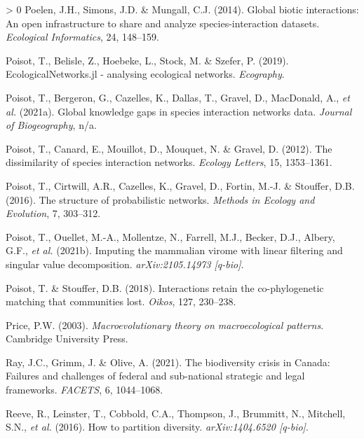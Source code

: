 \documentclass[11pt]{article}
\newlength{\cslhangindent}
\newenvironment{CSLReferences}[3] %
 {%
  \setlength{\parindent}{0pt}
  \ifodd #1 \everypar{\setlength{\hangindent}{\cslhangindent}}\ignorespaces\fi
  \ifnum #2 > 0
  \setlength{\parskip}{#2\baselineskip}
  \fi
 }%
 {}
\begin{document}
\begin{CSLReferences}{1}{0}
\leavevmode\hypertarget{ref-Poelen2014GloBio}{}%
Poelen, J.H., Simons, J.D. \& Mungall, C.J. (2014). Global biotic
interactions: An open infrastructure to share and analyze
species-interaction datasets. \emph{Ecological Informatics}, 24,
148--159.

\leavevmode\hypertarget{ref-Poisot2019EcoJl}{}%
Poisot, T., Belisle, Z., Hoebeke, L., Stock, M. \& Szefer, P. (2019).
EcologicalNetworks.jl - analysing ecological networks. \emph{Ecography}.

\leavevmode\hypertarget{ref-Poisot2021GloKno}{}%
Poisot, T., Bergeron, G., Cazelles, K., Dallas, T., Gravel, D.,
MacDonald, A., \emph{et al.} (2021a). Global knowledge gaps in species
interaction networks data. \emph{Journal of Biogeography}, n/a.

\leavevmode\hypertarget{ref-Poisot2012DisSpe}{}%
Poisot, T., Canard, E., Mouillot, D., Mouquet, N. \& Gravel, D. (2012).
The dissimilarity of species interaction networks. \emph{Ecology
Letters}, 15, 1353--1361.

\leavevmode\hypertarget{ref-Poisot2016StrPro}{}%
Poisot, T., Cirtwill, A.R., Cazelles, K., Gravel, D., Fortin, M.-J. \&
Stouffer, D.B. (2016). The structure of probabilistic networks.
\emph{Methods in Ecology and Evolution}, 7, 303--312.

\leavevmode\hypertarget{ref-Poisot2021ImpMam}{}%
Poisot, T., Ouellet, M.-A., Mollentze, N., Farrell, M.J., Becker, D.J.,
Albery, G.F., \emph{et al.} (2021b). Imputing the mammalian virome with
linear filtering and singular value decomposition.
\emph{arXiv:2105.14973 {[}q-bio{]}}.

\leavevmode\hypertarget{ref-Poisot2018IntRet}{}%
Poisot, T. \& Stouffer, D.B. (2018). Interactions retain the
co-phylogenetic matching that communities lost. \emph{Oikos}, 127,
230--238.

\leavevmode\hypertarget{ref-Price2003MacThe}{}%
Price, P.W. (2003). \emph{Macroevolutionary theory on macroecological
patterns}. Cambridge University Press.

\leavevmode\hypertarget{ref-Ray2021BioCri}{}%
Ray, J.C., Grimm, J. \& Olive, A. (2021). The biodiversity crisis in
Canada: Failures and challenges of federal and sub-national strategic
and legal frameworks. \emph{FACETS}, 6, 1044--1068.

\leavevmode\hypertarget{ref-Reeve2016HowPar}{}%
Reeve, R., Leinster, T., Cobbold, C.A., Thompson, J., Brummitt, N.,
Mitchell, S.N., \emph{et al.} (2016). How to partition diversity.
\emph{arXiv:1404.6520 {[}q-bio{]}}.


\end{CSLReferences}
\end{document}
